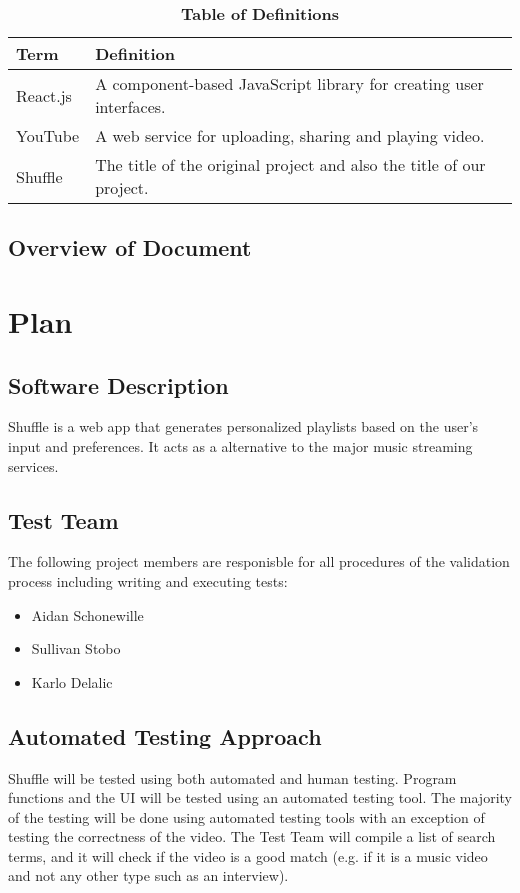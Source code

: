 \documentclass[12pt, titlepage]{article}
\begin{document}
\begin{table}[!htbp]
\caption{\textbf{Table of Definitions}} \label{Table}

\begin{tabularx}{\textwidth}{p{3cm}X}
\toprule
\textbf{Term} & \textbf{Definition}\\
\midrule
React.js & A component-based JavaScript library for creating user interfaces.\\
YouTube & A web service for uploading, sharing and playing video.\\
Shuffle & The title of the original project and also the title of our project.\\
\bottomrule
\end{tabularx}

\end{table}	

\subsection{Overview of Document}

\section{Plan}
	
\subsection{Software Description}
Shuffle is a web app that generates personalized playlists based on the user’s input and
preferences. It acts as a alternative to the major music streaming services.

\subsection{Test Team}
The following project members are responisble for all procedures of the validation process including writing and executing tests:
\begin{itemize}
\item Aidan Schonewille
\item Sullivan Stobo
\item Karlo Delalic
\end{itemize}

\subsection{Automated Testing Approach}
Shuffle will be tested using both automated and human testing. Program functions and the UI will be tested using an automated testing tool. The majority of the testing will be done using automated testing tools with an exception of testing the correctness of the video. The Test Team will compile a list of search terms, and it will check if the video is a good match (e.g. if it is a music video and not any other type such as an interview).
\end{document}
